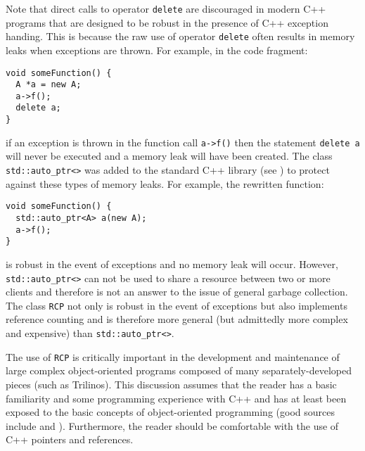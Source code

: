 \documentclass[pdf,ps2pdf,11pt]{SANDreport}
\begin{document}
Note that direct calls to operator {}\texttt{delete} are discouraged
in modern C++ programs that are designed to be robust in the presence
of C++ exception handing.  This is because the raw use of operator
{}\texttt{delete} often results in memory leaks when exceptions are
thrown.  For example, in the code fragment:

{\small\begin{verbatim}
void someFunction() {
  A *a = new A;
  a->f();
  delete a;
}
\end{verbatim}}

{}\noindent{}if an exception is thrown in the function call
{}\texttt{a->f()} then the statement {}\texttt{delete a} will never be
executed and a memory leak will have been created.  The class
{}\texttt{std::auto\_\-ptr<>} was added to the standard C++ library
(see {}\cite[Items 9 and 10]{ref:meyers_1996}) to protect against
these types of memory leaks.  For example, the rewritten function:

{\small\begin{verbatim}
void someFunction() {
  std::auto_ptr<A> a(new A);
  a->f();
}
\end{verbatim}}

{}\noindent{}is robust in the event of exceptions and no memory leak
will occur.  However, {}\texttt{std::auto\_\-ptr<>} can not be used to
share a resource between two or more clients and therefore is not an
answer to the issue of general garbage collection.  The class
{}\texttt{RCP} not only is robust in the event of
exceptions but also implements reference counting and is therefore
more general (but admittedly more complex and expensive) than
{}\texttt{std::auto\_\-ptr<>}.

The use of {}\texttt{RCP} is critically important in the
development and maintenance of large complex object-oriented programs
composed of many separately-developed pieces (such as Trilinos).  This
discussion assumes that the reader has a basic familiarity and some
programming experience with C++ and has at least been exposed to the
basic concepts of object-oriented programming (good sources include
{}\cite{ref:gama_et_al_1995} and {}\cite{ref:stroustrup_2000}).
Furthermore, the reader should be comfortable with the use of C++
pointers and references.
\end{document}
